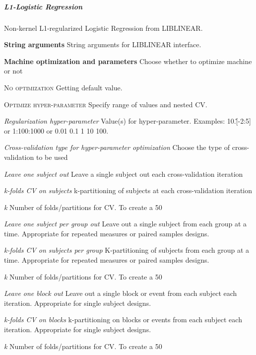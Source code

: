 \subparagraph{L1-Logistic Regression}
Non-kernel L1-regularized Logistic Regression from LIBLINEAR.


\textbf{String arguments}
String arguments for LIBLINEAR interface.


\textbf{Machine optimization and parameters}
Choose whether to optimize machine or not


\textsc{No optimization}
Getting default value.


\textsc{Optimize hyper-parameter}
Specify range of values and nested CV.


\textsl{Regularization hyper-parameter}
Value(s) for hyper-parameter. Examples: 10.\^[-2:5] or 1:100:1000 or 0.01 0.1 1 10 100.


\textsl{Cross-validation type for hyper-parameter optimization}
Choose the type of cross-validation to be used


\textit{Leave one subject out}
Leave a single subject out each cross-validation iteration


\textit{k-folds CV on subjects}
k-partitioning of subjects at each cross-validation iteration


\textit{k}
Number of folds/partitions for CV. To create a 50%


\textit{Leave one subject per group out}
Leave out a single subject from each group at a time. Appropriate for repeated measures or paired samples designs.


\textit{k-folds CV on subjects per group}
K-partitioning of subjects from each group at a time. Appropriate for repeated measures or paired samples designs.


\textit{k}
Number of folds/partitions for CV. To create a 50%


\textit{Leave one block out}
Leave out a single block or event from each subject each iteration. Appropriate for single subject designs.


\textit{k-folds CV on blocks}
k-partitioning on blocks or events from each subject each iteration. Appropriate for single subject designs.


\textit{k}
Number of folds/partitions for CV. To create a 50%


